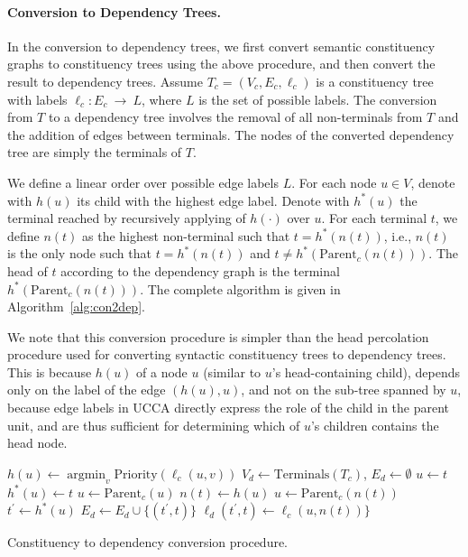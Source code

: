 \documentclass[11pt]{article}
\DeclareMathOperator*{\argmin}{argmin}
\begin{document}
\paragraph{Conversion to Dependency Trees.}\label{subsec:con2dep}
In the conversion to dependency trees, we first convert semantic constituency graphs
to constituency trees using the above procedure, and then convert the result to dependency trees. 
Assume $T_c=(V_c,E_c,\ell_c)$ is a constituency tree with labels $\ell_c:E_c~\rightarrow~L$,
where $L$ is the set of possible labels.
The conversion from $T$ to a dependency tree involves the removal of
all non-terminals from $T$ and the addition of edges between terminals.
The nodes of the converted dependency tree are simply the terminals of $T$.

We define a linear order over possible edge labels $L$.
For each node $u \in V$, denote with $h(u)$ its child with the highest edge label.
Denote with $h^*(u)$ the terminal reached by recursively applying of $h(\cdot)$ over $u$.
For each terminal $t$, we define $n(t)$ as the highest
non-terminal such that $t=h^*(n(t))$, i.e.,
$n(t)$ is the only node such that $t=h^*(n(t))$ and $t \neq h^*(\mathrm{Parent}_c(n(t)))$.
The head of $t$ according to the dependency graph is
the terminal $h^*(\mathrm{Parent}_c(n(t)))$.
The complete algorithm is given in Algorithm~\ref{alg:con2dep}.

We note that this conversion procedure is simpler than the
head percolation procedure used for converting syntactic constituency
trees to dependency trees.
This is because $h(u)$ of a node $u$ (similar to $u$'s head-containing child),
depends only on the label of the edge $(h(u),u)$, and not on the sub-tree spanned by $u$,
because edge labels in UCCA directly express the role of the child in the parent unit, and
are thus sufficient for determining which of $u$'s children contains the head node.


\begin{algorithm}[t]
  {
  $h(u) \leftarrow \argmin_v \mathrm{Priority}(\ell_c(u,v))$\;
 }
 $V_d \leftarrow \mathrm{Terminals}({T_c})$,
 $E_d \leftarrow \emptyset$\;
  {
  $u \leftarrow t$\;
   {
  	$h^*(u) \leftarrow t$\;
  	$u \leftarrow \mathrm{Parent}_c(u)$\;
  }
  $n(t) \leftarrow h(u)$\;
 }
  {
  $u \leftarrow \mathrm{Parent}_c(n(t))$\;
  $t^\prime \leftarrow h^*(u)$\;
  $E_d \leftarrow E_d \cup \{(t^\prime, t)\}$\;
  $\ell_d (t^\prime, t) \leftarrow \ell_c(u, n(t))\}$\;
 }
 \caption{Constituency to dependency conversion procedure.}
 \label{alg:con2dep}
\end{algorithm}
\end{document}
